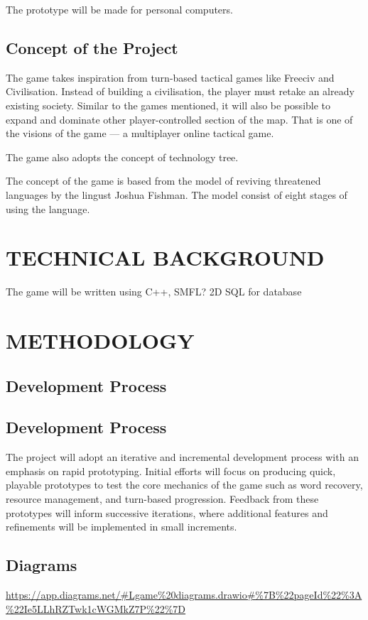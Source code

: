 \documentclass[11pt]{article}
\begin{document}
The prototype will be made for personal computers.

\subsection{Concept of the Project}
The game takes inspiration from turn-based tactical games like Freeciv and Civilisation. Instead of building a civilisation, the player must retake an already existing society. Similar to the games mentioned, it will also be possible to expand and dominate other player-controlled section of the map. That is one of the visions of the game --- a multiplayer online tactical game.

The game also adopts the concept of technology tree. 

The concept of the game is based from the model of reviving threatened languages by the lingust Joshua Fishman. The model consist of eight stages of using the language. 

\section{TECHNICAL BACKGROUND}
The game will be written using C++, SMFL? 2D
SQL for database

\section{METHODOLOGY}
\subsection{Development Process}
\subsection{Development Process}
The project will adopt an iterative and incremental development process with an emphasis on rapid prototyping. 
Initial efforts will focus on producing quick, playable prototypes to test the core mechanics of the game such as word recovery, resource management, and turn-based progression. 
Feedback from these prototypes will inform successive iterations, where additional features and refinements will be implemented in small increments. 

\subsection{Diagrams}
\url{https://app.diagrams.net/#Lgame%20diagrams.drawio#%7B%22pageId%22%3A%22Ie5LLhRZTwk1cWGMkZ7P%22%7D}
\end{document}

